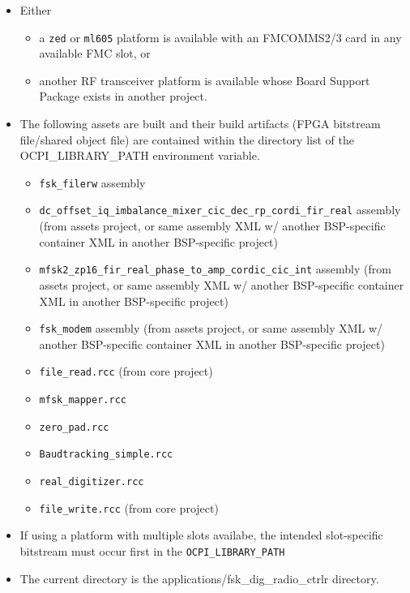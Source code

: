     \begin{itemize}
      \item Either
        \begin{itemize}
          \item a \verb+zed+ or \verb+ml605+ platform is available with an
            FMCOMMS2/3 card in any available FMC slot, or
          \item another RF transceiver platform is available whose Board Support
            Package exists in
            another project.
        \end{itemize}
      \item The following assets are built and their build artifacts (FPGA
        bitstream file/shared object file) are contained within the directory
        list
        of the OCPI\_LIBRARY\_PATH environment variable.
      \begin{itemize}
        \item \verb+fsk_filerw+ assembly
        \item \verb+dc_offset_iq_imbalance_mixer_cic_dec_rp_cordi_fir_real+
          assembly (from assets project, or same assembly XML
          w/ another
          BSP-specific container XML in another
          BSP-specific project)
        \item \verb+mfsk2_zp16_fir_real_phase_to_amp_cordic_cic_int+
          assembly (from assets project, or same assembly XML
          w/ another
          BSP-specific container XML in another
          BSP-specific project)
        \item \verb+fsk_modem+ assembly (from assets project, or same assembly XML
          w/ another
          BSP-specific container XML in another
          BSP-specific project)
        \item \verb+file_read.rcc+ (from core project)
        \item \verb+mfsk_mapper.rcc+
        \item \verb+zero_pad.rcc+
        \item \verb+Baudtracking_simple.rcc+
        \item \verb+real_digitizer.rcc+
        \item \verb+file_write.rcc+ (from core project)
      \end{itemize}
    \item If using a platform with multiple slots availabe, the intended
      slot-specific bitstream must occur first in the
      \texttt{OCPI\_LIBRARY\_PATH}
    \item The current directory is the applications/fsk\_dig\_radio\_ctrlr directory.
    \end{itemize}

